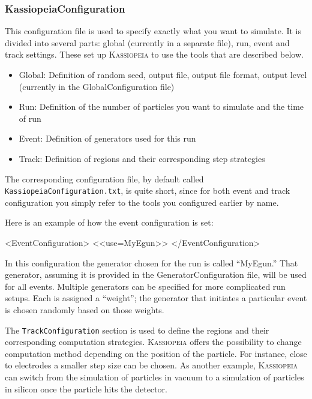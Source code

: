 \subsubsection{KassiopeiaConfiguration}
This configuration file is used to specify exactly what you want to simulate.  It is divided into several parts: global (currently in a separate file), run, event and track settings.  These set up \textsc{Kassiopeia} to use the tools that are described below.
\begin{itemize}
	\item Global: Definition of random seed, output file, output file format, output level (currently in the GlobalConfiguration file)
	\item Run: Definition of the number of particles you want to simulate and the time of run
	\item Event: Definition of generators used for this run
	\item Track: Definition of regions and their corresponding step strategies
\end{itemize}
The corresponding configuration file, by default called \texttt{KassiopeiaConfiguration.txt}, is quite short, since for both event and track configuration you simply refer to the tools you configured earlier by name.

Here is an example of how the event configuration is set:
\begin{DoxyCode}
<EventConfiguration>
    <<use=MyEgun>> 
</EventConfiguration>
\end{DoxyCode}
In this configuration the generator chosen for the run is called ``MyEgun.''  That generator, assuming it is provided in the GeneratorConfiguration file, will be used for all events.  Multiple generators can be specified for more complicated run setups.  Each is assigned a ``weight''; the generator that initiates a particular event is chosen randomly based on those weights.

The \texttt{TrackConfiguration} section is used to define the regions and their corresponding computation strategies.  \textsc{Kassiopeia} offers the possibility to change computation method depending on the position of the particle. For instance, close to electrodes a smaller step size can be chosen. As another example, \textsc{Kassiopeia} can switch from the simulation of particles in vacuum to a simulation of particles in silicon once the particle hits the detector.


